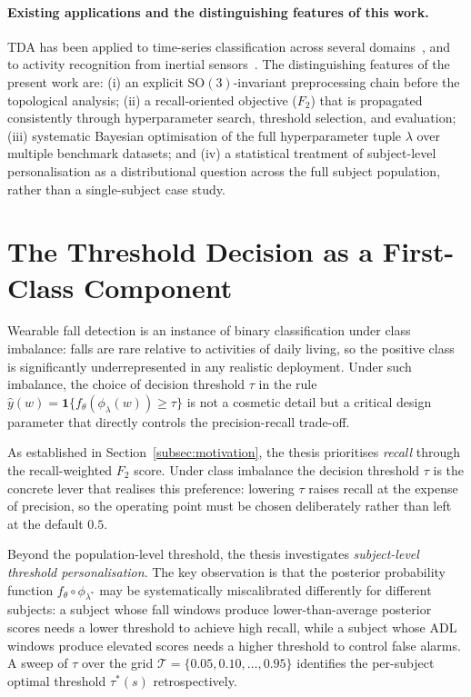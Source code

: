 \documentclass[onluarkali,ingilizce,yukseklisans,karton,LisansustuEgitim]{itutez}
\providecommand{\1}{\mathbf{1}}
\begin{document}
\paragraph{Existing applications and the distinguishing features of this work.}
TDA has been applied to time-series classification across several
domains~\parencite{gidea2018topological, pereira2015persistent, umeda2017time}, and
to activity recognition from inertial
sensors~\parencite{xu2019topological, ott2017topological}.  The distinguishing features
of the present work are: (i) an explicit $\mathrm{SO}(3)$-invariant preprocessing chain before the topological analysis; (ii) a recall-oriented objective ($F_2$) that is propagated consistently through hyperparameter search, threshold selection, and evaluation; (iii) systematic Bayesian optimisation of the full hyperparameter tuple $\lambda$ over multiple benchmark datasets; and (iv) a statistical treatment of subject-level personalisation as a distributional question across the full subject population, rather than a single-subject case study.

\section{The Threshold Decision as a First-Class Component}
\label{subsec:threshold-intro}

Wearable fall detection is an instance of binary classification under class imbalance:
falls are rare relative to activities of daily living, so the positive class is
significantly underrepresented in any realistic deployment.  Under such imbalance,
the choice of decision threshold $\tau$ in the rule
$\widehat{y}(w)=\mathbf{1}\{f_\theta(\phi_\lambda(w))\geq\tau\}$
is not a cosmetic detail but a critical design parameter that directly controls the
precision-recall trade-off.

As established in Section~\ref{subsec:motivation}, the thesis prioritises \emph{recall}
through the recall-weighted $F_2$ score. Under class imbalance the decision threshold
$\tau$ is the concrete lever that realises this preference: lowering $\tau$ raises
recall at the expense of precision, so the operating point must be chosen deliberately
rather than left at the default $0.5$.

Beyond the population-level threshold, the thesis investigates \emph{subject-level
threshold personalisation}.  The key observation is that the posterior probability
function $f_\theta\circ\phi_{\lambda^*}$ may be systematically miscalibrated
differently for different subjects: a subject whose fall windows produce
lower-than-average posterior scores needs a lower threshold to achieve high recall,
while a subject whose ADL windows produce elevated scores needs a higher threshold to
control false alarms.  A sweep of $\tau$ over the grid
$\mathcal{T}=\{0.05,0.10,\ldots,0.95\}$ identifies the per-subject optimal threshold
$\tau^*(s)$ retrospectively.
\end{document}
